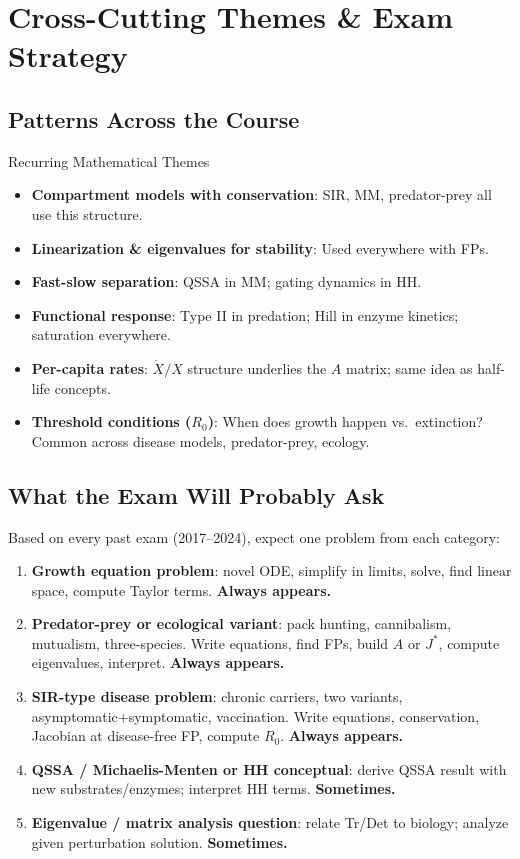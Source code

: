 \documentclass[11pt]{article}
\begin{document}
\section{Cross-Cutting Themes \& Exam Strategy}

\subsection{Patterns Across the Course}

\begin{summarybox}{Recurring Mathematical Themes}
\begin{itemize}
\item \textbf{Compartment models with conservation}: SIR, MM, predator-prey all use this structure.
\item \textbf{Linearization \& eigenvalues for stability}: Used everywhere with FPs.
\item \textbf{Fast-slow separation}: QSSA in MM; gating dynamics in HH.
\item \textbf{Functional response}: Type II in predation; Hill in enzyme kinetics; saturation everywhere.
\item \textbf{Per-capita rates}: $\dot X/X$ structure underlies the $A$ matrix; same idea as half-life concepts.
\item \textbf{Threshold conditions ($R_0$)}: When does growth happen vs.\ extinction? Common across disease models, predator-prey, ecology.
\end{itemize}
\end{summarybox}

\subsection{What the Exam Will Probably Ask}

Based on every past exam (2017--2024), expect one problem from each category:

\begin{enumerate}
\item \textbf{Growth equation problem}: novel ODE, simplify in limits, solve, find linear space, compute Taylor terms. \textbf{Always appears.}
\item \textbf{Predator-prey or ecological variant}: pack hunting, cannibalism, mutualism, three-species. Write equations, find FPs, build $A$ or $J^*$, compute eigenvalues, interpret. \textbf{Always appears.}
\item \textbf{SIR-type disease problem}: chronic carriers, two variants, asymptomatic+symptomatic, vaccination. Write equations, conservation, Jacobian at disease-free FP, compute $R_0$. \textbf{Always appears.}
\item \textbf{QSSA / Michaelis-Menten or HH conceptual}: derive QSSA result with new substrates/enzymes; interpret HH terms. \textbf{Sometimes.}
\item \textbf{Eigenvalue / matrix analysis question}: relate Tr/Det to biology; analyze given perturbation solution. \textbf{Sometimes.}
\end{enumerate}
\end{document}
